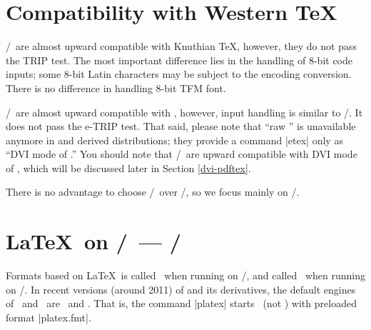 \documentclass[a4paper,11pt,dvipdfmx]{article}
\let\emph=\origemph
\begin{document}
\section{Compatibility with Western \TeX}\label{compat}

\pTeX/\upTeX\ are almost upward compatible with Knuthian \TeX,
however, they do not pass the TRIP test.
The most important difference lies in the handling of 8-bit code inputs;
some 8-bit Latin characters may be subject to the encoding conversion.
There is no difference in handling 8-bit TFM font.

\epTeX/\eupTeX\ are almost upward compatible with \eTeX,
however, input handling is similar to \pTeX/\upTeX.
It does not pass the e-TRIP test.
That said, please note that ``raw \eTeX'' is unavailable anymore
in \TL and derived distributions;
they provide a command |etex| only as ``DVI mode of \pdfTeX.''
You should note that
\epTeX/\eupTeX\ are \emph{not} upward compatible with DVI mode of \pdfTeX,
which will be discussed later in Section \ref{dvi-pdftex}.

There is no advantage to choose \pTeX/\upTeX\ over \epTeX/\eupTeX,
so we focus mainly on \epTeX/\eupTeX.

\section{\LaTeX\ on \pTeX/\upTeX\ --- \pLaTeX/\upLaTeX}

Formats based on \LaTeX\ is called \pLaTeX\ when running on \pTeX/\epTeX,
and called \upLaTeX\ when running on \upTeX/\eupTeX.
In recent versions (around 2011) of \TL and its derivatives,
the default engines of \pLaTeX\ and \upLaTeX\ are \epTeX\ and \eupTeX.
That is, the command |platex| starts \epTeX\ (not \pTeX) with
preloaded format |platex.fmt|.
\end{document}
